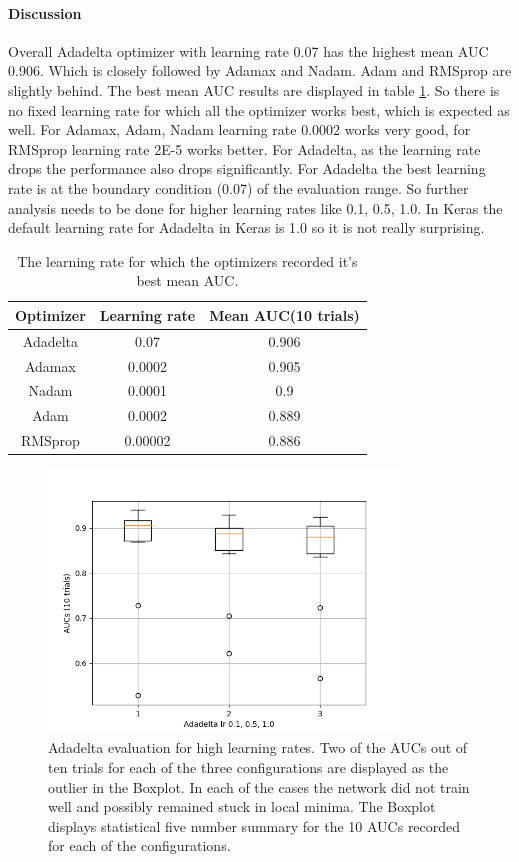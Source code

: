 \paragraph{Discussion\\}
Overall Adadelta optimizer with learning rate 0.07 has the highest mean AUC 0.906. Which is closely followed by Adamax and Nadam. Adam and RMSprop are slightly behind. The best mean AUC results are displayed 
in table \ref{table:best_optimizers}. So there is no fixed learning rate for which all the optimizer works best, which is expected as well. For Adamax, Adam, Nadam learning rate 0.0002 works very good, for RMSprop learning rate 2E-5 works better. 
For Adadelta, as the learning rate drops the performance also drops significantly. For Adadelta the best learning rate is at the boundary condition (0.07) of the evaluation range. So further analysis needs to be done for higher learning 
rates like 0.1, 0.5, 1.0. In Keras the default learning rate for Adadelta in Keras is 1.0 so it is not really surprising. 

\begin{table}[htb]
 \centering
 \caption{The learning rate for which the optimizers recorded it's best mean AUC.}
 \begin{tabular}{|c c c|} 
 \hline\hline
 \rowcolor{lightgrey}
 Optimizer & Learning rate & Mean AUC(10 trials) \\ [0.5ex] 
 \hline
 Adadelta & 0.07 & 0.906 \\
 \hline
 Adamax & 0.0002 & 0.905 \\
 \hline
 Nadam & 0.0001 & 0.9 \\
 \hline
 Adam & 0.0002 & 0.889 \\
 \hline 
 RMSprop & 0.00002 & 0.886\\
 \hline \hline
\end{tabular}
\label{table:best_optimizers}
\end{table}

\begin{figure}[htp]
\centering
\includegraphics[height=7cm,height=5cm]{images/densenet/adadelta_highlr_analysis}
\caption[Adadelta evaluation for high learning rates.]{Adadelta evaluation for high learning rates. Two of the AUCs out of ten trials for each of the three configurations are displayed as the outlier in the Boxplot. 
In each of the cases the network did not train well and possibly remained stuck in local minima. The Boxplot displays statistical five number summary for the 10 AUCs recorded for each of the configurations.}
\label{fig:adadelta_highlr_analysis}
\end{figure}

